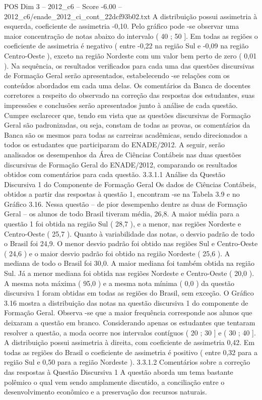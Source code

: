 \begin{textsample}{POS Dim 3 – 2012\_c6 – Score -6.00 – 2012\_c6/enade\_2012\_ci\_cont\_22dcf93b02.txt}
A distribuição possui assimetria à esquerda, coeficiente de assimetria -0,10.
Pelo gráfico pode -se observar uma maior concentração de notas abaixo do intervalo ( 40 ; 50 ].
Em todas as regiões o coeficiente de assimetria é negativo ( entre -0,22 na região Sul e -0,09 na região Centro-Oeste ), exceto na região Nordeste com um valor bem perto de zero ( 0,01 ).
Na sequência, os resultados verificados para cada uma das questões discursivas de Formação Geral serão apresentados, estabelecendo -se relações com os conteúdos abordados em cada uma delas.
Os comentários da Banca de docentes corretores a respeito do observado na correção das respostas dos estudantes, suas impressões e conclusões serão apresentados junto à análise de cada questão.
Cumpre esclarecer que, tendo em vista que as questões discursivas de Formação Geral são padronizadas, ou seja, constam de todas as provas, os comentários da Banca são os mesmos para todas as carreiras acadêmicas, sendo direcionados a todos os estudantes que participaram do ENADE/2012.
A seguir, serão analisados os desempenhos da Área de Ciências Contábeis nas duas questões discursivas de Formação Geral do ENADE/2012, comparando os resultados obtidos com comentários para cada questão. 3.3.1.1 Análise da Questão Discursiva 1 do Componente de Formação Geral Os dados de Ciências Contábeis, obtidos a partir das respostas à questão 1, encontram -se na Tabela 3.9 e no Gráfico 3.16.
Nessa questão – de pior desempenho dentre as duas de Formação Geral – os alunos de todo Brasil tiveram média, 26,8.
A maior média para a questão 1 foi obtida na região Sul ( 28,7 ), e a menor, nas regiões Nordeste e Centro-Oeste ( 25,7 ).
Quanto à variabilidade das notas, o desvio padrão de todo o Brasil foi 24,9.
O menor desvio padrão foi obtido nas regiões Sul e Centro-Oeste ( 24,6 ) e o maior desvio padrão foi obtido na região Nordeste ( 25,6 ).
A mediana de todo o Brasil foi 30,0.
A maior mediana foi também obtida na região Sul.
Já a menor mediana foi obtida nas regiões Nordeste e Centro-Oeste ( 20,0 ).
A mesma nota máxima ( 95,0 ) e a mesma nota mínima ( 0,0 ) da questão discursiva 1 foram obtidas em todas as regiões do Brasil, sem exceção.
O Gráfico 3.16 mostra a distribuição das notas na questão discursiva 1 do componente de Formação Geral.
Observa -se que a maior frequência corresponde aos alunos que deixaram a questão em branco.
Considerando apenas os estudantes que tentaram resolver a questão, a moda ocorre nos intervalos contíguos ( 20 ; 30 ] e ( 30 ; 40 ].
A distribuição possui assimetria à direita, com coeficiente de assimetria 0,42.
Em todas as regiões do Brasil o coeficiente de assimetria é positivo ( entre 0,32 para a região Sul e 0,50 para a região Nordeste ). 3.3.1.2 Comentários sobre a correção das respostas à Questão Discursiva 1 A questão aborda um tema bastante polêmico o qual vem sendo amplamente discutido, a conciliação entre o desenvolvimento econômico e a preservação dos recursos naturais.

\end{textsample}
